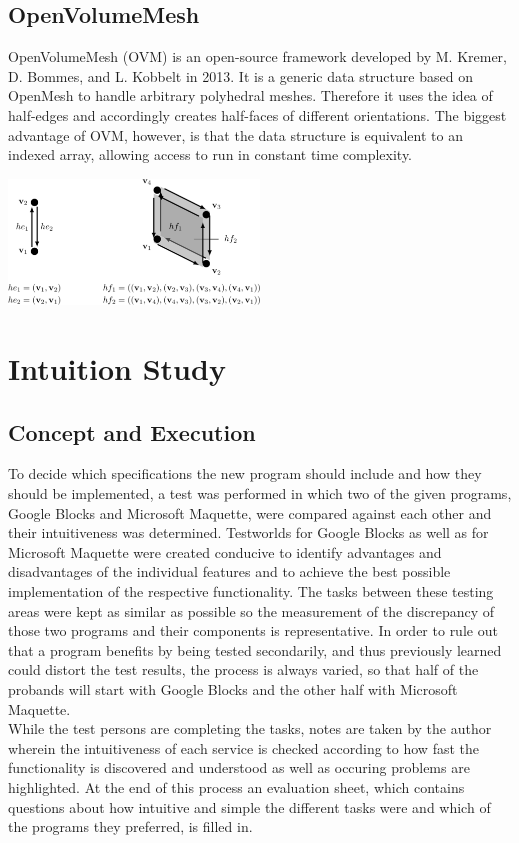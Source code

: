 \documentclass{report}
\begin{document}
	\section[OpenVolumeMesh]{OpenVolumeMesh \textsc{\small{\cite{OVM}}}}
		OpenVolumeMesh (OVM) is an open-source framework developed by M. Kremer, D. Bommes, and L. Kobbelt in 2013. It is a generic data structure based on OpenMesh to handle arbitrary polyhedral meshes. Therefore it uses the idea of half-edges and accordingly creates half-faces of different orientations. The biggest advantage of OVM, however, is that the data structure is equivalent to an indexed array, allowing access to run in constant time complexity. \\
		\begin{center}
			\includegraphics[width=0.5\textwidth]{halfedge_halfface.png} 
		\end{center}

\chapter{Intuition Study}

	\section{Concept and Execution}					
		To decide which specifications the new program should include and how they should be implemented, a test was performed in which two of the given programs, Google Blocks and Microsoft Maquette, were compared against each other and their intuitiveness was determined. Testworlds for Google Blocks as well as for Microsoft Maquette were created conducive to identify advantages and disadvantages of the individual features and to achieve the best possible implementation of the respective functionality. The tasks between these testing areas were kept as similar as possible so the measurement of the discrepancy of those two programs and their components is representative. In order to rule out that a program benefits by being tested secondarily, and thus previously learned could distort the test results, the process is always varied, so that half of the probands will start with Google Blocks and the other half with Microsoft Maquette. \\
		While the test persons are completing the tasks, notes are taken by the author wherein the intuitiveness of each service is checked according to how fast the functionality is discovered and understood as well as occuring problems are highlighted. At the end of this process an evaluation sheet, which contains questions about how intuitive and simple the different tasks were and which of the programs they preferred, is filled in.	
\end{document}
